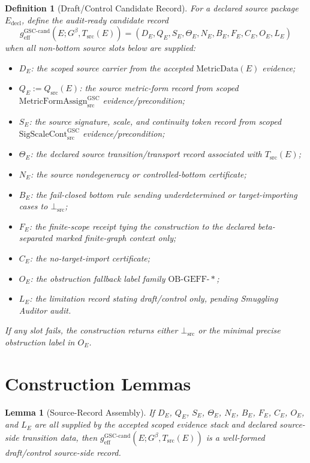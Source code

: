 \documentclass[11pt]{article}
\newtheorem{definition}{Definition}
\newtheorem{lemma}{Lemma}
\newcommand{\Gbeta}{G^{\beta}}
\newcommand{\SigScaleCont}{\mathrm{SigScaleCont}^{\mathrm{GSC}}_{\mathrm{src}}}
\newcommand{\MetricFormAssign}{\mathrm{MetricFormAssign}^{\mathrm{GSC}}_{\mathrm{src}}}
\newcommand{\Qsrc}{Q_{\mathrm{src}}}
\newcommand{\Tsrc}{T_{\mathrm{src}}}
\newcommand{\BottomSrc}{\bot_{\mathrm{src}}}
\newcommand{\geffCand}{g_{\mathrm{eff}}^{\mathrm{GSC\mbox{-}cand}}}
\newcommand{\OBGEFF}{\mathrm{OB\mbox{-}GEFF}}
\begin{document}
\begin{definition}[Draft/Control Candidate Record]
For a declared source package \(E_{\mathrm{decl}}\), define the audit-ready
candidate record
\[
  \geffCand(E;\Gbeta,\Tsrc(E)) =
  (D_E,Q_E,S_E,\Theta_E,N_E,B_E,F_E,C_E,O_E,L_E)
\]
when all non-bottom source slots below are supplied:
\begin{itemize}
  \item \(D_E\): the scoped source carrier from the accepted
  \(\mathrm{MetricData}(E)\) evidence;
  \item \(Q_E := \Qsrc(E)\): the source metric-form record from scoped
  \(\MetricFormAssign\) evidence/precondition;
  \item \(S_E\): the source signature, scale, and continuity token record from
  scoped \(\SigScaleCont\) evidence/precondition;
  \item \(\Theta_E\): the declared source transition/transport record
  associated with \(\Tsrc(E)\);
  \item \(N_E\): the source nondegeneracy or controlled-bottom certificate;
  \item \(B_E\): the fail-closed bottom rule sending underdetermined or
  target-importing cases to \(\BottomSrc\);
  \item \(F_E\): the finite-scope receipt tying the construction to the
  declared beta-separated marked finite-graph context only;
  \item \(C_E\): the no-target-import certificate;
  \item \(O_E\): the obstruction fallback label family
  \(\OBGEFF\mbox{-}*\);
  \item \(L_E\): the limitation record stating draft/control only, pending
  Smuggling Auditor audit.
\end{itemize}
If any slot fails, the construction returns either \(\BottomSrc\) or the
minimal precise obstruction label in \(O_E\).
\end{definition}

\section*{Construction Lemmas}

\begin{lemma}[Source-Record Assembly]
If \(D_E\), \(Q_E\), \(S_E\), \(\Theta_E\), \(N_E\), \(B_E\), \(F_E\),
\(C_E\), \(O_E\), and \(L_E\) are all supplied by the accepted scoped evidence
stack and declared source-side transition data, then
\(\geffCand(E;\Gbeta,\Tsrc(E))\) is a well-formed draft/control source-side
record.
\end{lemma}
\end{document}
